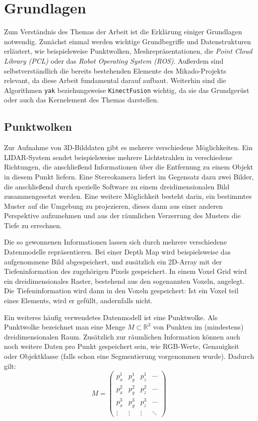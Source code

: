 \chapter{Grundlagen}

Zum Verständnis des Themas der Arbeit ist die Erklärung einiger Grundlagen notwendig.
Zunächst einmal werden wichtige Grundbegriffe und Datenstrukturen erläutert, wie beispielsweise Punktwolken, Meshrepräsentationen, die \textit{Point Cloud Library (PCL)} oder das \textit{Robot Operating System (ROS)}.
Außerdem sind selbstverständlich die bereits bestehenden Elemente des Mikado-Projekts relevant, da diese Arbeit fundamental darauf aufbaut.
Weiterhin sind die Algorithmen \texttt{yak} beziehungsweise \texttt{KinectFusion} wichtig, da sie das Grundgerüst oder auch das Kernelement des Themas darstellen.


\section{Punktwolken}

Zur Aufnahme von 3D-Bilddaten gibt es mehrere verschiedene Möglichkeiten.
Ein LIDAR-System sendet beispielsweise mehrere Lichtstrahlen in verschiedene Richtungen, die anschließend Informationen über die Entfernung zu einem Objekt in diesem Punkt liefern. Eine Stereokamera liefert im Gegensatz dazu zwei Bilder, die anschließend durch spezielle Software zu einem dreidimensionalen Bild zusammengesetzt werden. Eine weitere Möglichkeit besteht darin, ein bestimmtes Muster auf die Umgebung zu projezieren, dieses dann aus einer anderen Perspektive aufzunehmen und aus der räumlichen Verzerrung des Musters die Tiefe zu errechnen.

Die so gewonnenen Informationen lassen sich durch mehrere verschiedene Datenmodelle repräsentieren. Bei einer Depth Map wird beispielsweise das aufgenommene Bild abgespeichert, und zusätzlich ein 2D-Array mit der Tiefeninformation des zugehörigen Pixels gespeichert. In einem Voxel Grid wird ein dreidimensionales Raster, bestehend aus den sogenannten Voxeln, angelegt. Die Tiefeninformation wird dann in den Voxeln gespeichert: Ist ein Voxel teil eines Elements, wird er gefüllt, andernfalls nicht.

Ein weiteres häufig verwendetes Datenmodell ist eine Punktwolke. Als Punktwolke bezeichnet man eine Menge $M \subset \mathbb{R}^3$ von Punkten im (mindestens) dreidimensionalen Raum. Zusätzlich zur räumlichen Information können auch noch weitere Daten pro Punkt gespeichert sein, wie RGB-Werte, Genauigkeit oder Objektklasse (falls schon eine Segmentierung vorgenommen wurde).
Dadurch gilt:
$$M = \begin{pmatrix}
p_x^1 & p_y^1 & p_z^1 & \cdots\\
p_x^2 & p_y^2 & p_z^2 & \cdots\\
p_x^3 & p_y^3 & p_z^3 & \cdots\\
\vdots & \vdots & \vdots & \ddots
\end{pmatrix}$$

